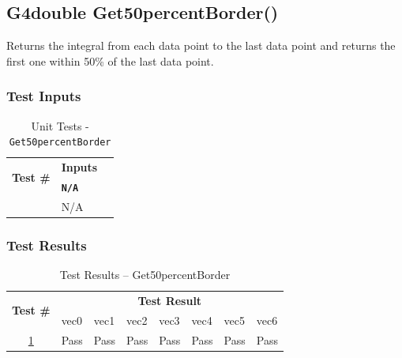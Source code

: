 \documentclass[12pt]{article}
\newcommand{\todo}[1]{\textcolor{red}{[TODO: #1]}} \else
\newcommand{\authornote}[3]{} \newcommand{\todo}[1]{} \fi
\newcommand{\ds}[1]{\authornote{blue}{DS}{#1}}
\newcounter{TestCounter}
\begin{document}
\subsection{G4double Get50percentBorder()}%
	
	 Returns the integral from each data point to the last data point and returns the first one within 
50\% of the last data point.
	
	\subsubsection{Test Inputs}
		\begin{table}[H]
		\centering
		\caption{Unit Tests - \texttt{Get50percentBorder}}\label{Get50percentBorder_unit}
		\begin{tabular}{lll}
		\toprule
		\multirow{2}{*}{\bf Test \#}  & \multicolumn{1}{c}{\bf Inputs}\\
		& \bf \texttt{N/A}\\\midrule
		{TestCounter}\arabic{TestCounter}\label{Get50percentBorder_0} & N/A \\
		\bottomrule
		\end{tabular}
		\end{table}
	
	\subsubsection{Test Results}
		\begin{table}[H]
		\centering
		\caption{Test Results -- Get50percentBorder}\label{Get50percentBorder_acc}
		\begin{tabular}{clllllll}
		\toprule
		\multirow{2}{*}{\bf Test \#} & \multicolumn{7}{c}{\bf Test Result}\\
		& vec0 & vec1 & vec2 & vec3 & vec4 & vec5 & vec6\\\midrule
		\ref{Get50percentBorder_0} & Pass & Pass & Pass & Pass & Pass & Pass & Pass\\
		\bottomrule
		\end{tabular}
		\end{table}
		
\ds{As an overall note: Please give each test case its own explicit explanation. 
Seeing tables that say ``Test\#XX -- -- -- --" is not very intuitive or helpful. 
Instead try something like ``Test\#XX (as a heading) then explain that 
parameter1=-1, parameter2=xyz ..." 
and explain the expected vs. actual output.}		
\end{document}
